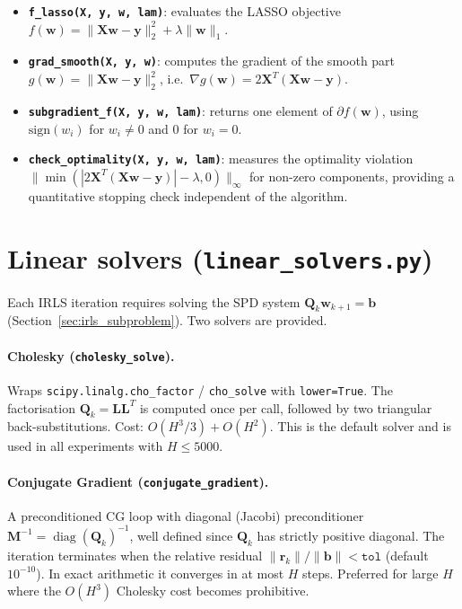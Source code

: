 \begin{itemize}
    \item \textbf{\texttt{f\_lasso(X, y, w, lam)}}: evaluates the LASSO objective
    $f(\mathbf{w}) = \|\mathbf{Xw}-\mathbf{y}\|_2^2 + \lambda\|\mathbf{w}\|_1$.

    \item \textbf{\texttt{grad\_smooth(X, y, w)}}: computes the gradient of the smooth part
    $g(\mathbf{w}) = \|\mathbf{Xw}-\mathbf{y}\|_2^2$, i.e.\
    $\nabla g(\mathbf{w}) = 2\mathbf{X}^T(\mathbf{Xw}-\mathbf{y})$.

    \item \textbf{\texttt{subgradient\_f(X, y, w, lam)}}: returns one element of
    $\partial f(\mathbf{w})$, using $\mathrm{sign}(w_i)$ for $w_i \neq 0$ and $0$
    for $w_i = 0$.

    \item \textbf{\texttt{check\_optimality(X, y, w, lam)}}: measures the optimality
    violation $\|\min(|2\mathbf{X}^T(\mathbf{Xw}-\mathbf{y})| - \lambda, 0)\|_\infty$
    for non-zero components, providing a quantitative stopping check independent of
    the algorithm.
\end{itemize}

\section{Linear solvers (\texttt{linear\_solvers.py})}
\label{sec:impl_solvers}

Each IRLS iteration requires solving the SPD system
$\mathbf{Q}_k\mathbf{w}_{k+1} = \mathbf{b}$
(Section~\ref{sec:irls_subproblem}). Two solvers are provided.

\paragraph{Cholesky (\texttt{cholesky\_solve}).}
Wraps \texttt{scipy.linalg.cho\_factor} / \texttt{cho\_solve} with \texttt{lower=True}.
The factorisation $\mathbf{Q}_k = \mathbf{L}\mathbf{L}^T$ is computed once per call,
followed by two triangular back-substitutions. Cost: $O(H^3/3) + O(H^2)$.
This is the default solver and is used in all experiments with $H \leq 5000$.

\paragraph{Conjugate Gradient (\texttt{conjugate\_gradient}).}
A preconditioned CG loop with diagonal (Jacobi) preconditioner
$\mathbf{M}^{-1} = \operatorname{diag}(\mathbf{Q}_k)^{-1}$, well defined since
$\mathbf{Q}_k$ has strictly positive diagonal.
The iteration terminates when the relative residual
$\|\mathbf{r}_k\| / \|\mathbf{b}\| < \texttt{tol}$ (default $10^{-10}$).
In exact arithmetic it converges in at most $H$ steps.
Preferred for large $H$ where the $O(H^3)$ Cholesky cost becomes prohibitive.

